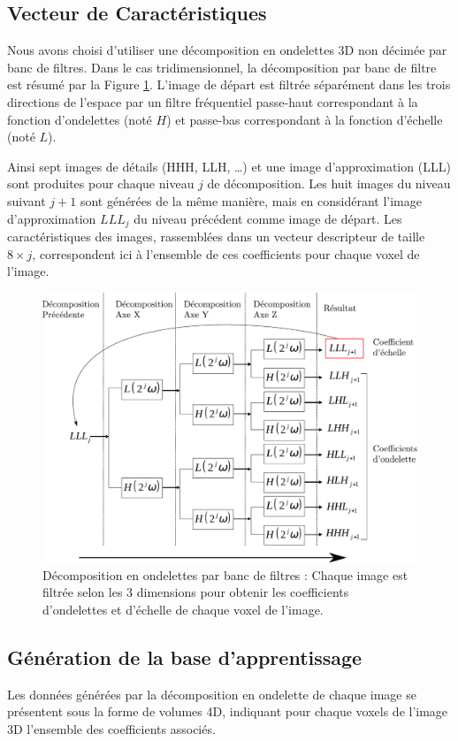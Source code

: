 \subsection{Vecteur de Caractéristiques}

Nous avons choisi d’utiliser une décomposition en ondelettes 3D non décimée par banc de filtres. Dans le cas tridimensionnel, la décomposition par banc de filtre est résumé par la Figure \ref{fig:ondelettes}. L’image de départ est filtrée séparément dans les trois directions de l’espace par un filtre fréquentiel passe-haut correspondant à la fonction d’ondelettes (noté $H$) et passe-bas correspondant à la fonction d’échelle (noté $L$). 

Ainsi sept images de détails (HHH, LLH, \dots) et une image d’approximation (LLL) sont produites pour chaque niveau $j$ de décomposition. Les huit images du niveau suivant $j+1$ sont générées de la même manière, mais en considérant l’image d’approximation $LLL_j$ du niveau précédent comme image de départ. Les caractéristiques des images, rassemblées dans un vecteur descripteur de taille $8\times j$, correspondent ici à l’ensemble de ces coefficients pour chaque voxel  de l’image. 

\begin{figure}
 \includegraphics[width=15cm]{images/decompHotell}
 \caption{Décomposition en ondelettes par banc de filtres : Chaque image est filtrée selon les 3 dimensions pour obtenir les coefficients d'ondelettes et d'échelle de chaque voxel de l'image.}
 \label{fig:ondelettes}
\end{figure}


\subsection{Génération de la base d'apprentissage}
Les données générées par la décomposition en ondelette de chaque image se présentent sous la forme de volumes 4D, indiquant pour chaque voxels de l'image 3D l'ensemble des coefficients associés.

